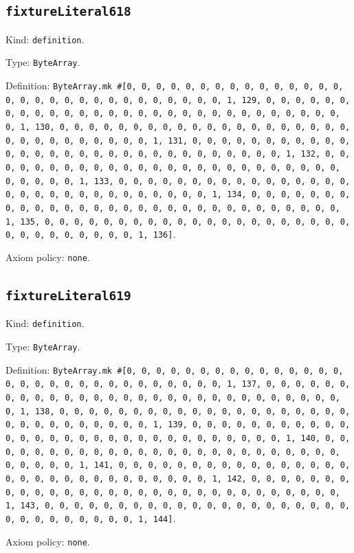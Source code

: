 \documentclass[11pt]{article}
\begin{document}
\subsection*{\texttt{fixtureLiteral618}}
\noindent Kind: \texttt{definition}.\par
\noindent Type: \texttt{ByteArray}.\par
\noindent Definition: \texttt{ByteArray.mk \#[0, 0, 0, 0, 0, 0, 0, 0, 0, 0, 0, 0, 0, 0, 0, 0, 0, 0, 0, 0, 0, 0, 0, 0, 0, 0, 0, 0, 0, 0, 1, 129, 0, 0, 0, 0, 0, 0, 0, 0, 0, 0, 0, 0, 0, 0, 0, 0, 0, 0, 0, 0, 0, 0, 0, 0, 0, 0, 0, 0, 0, 0, 1, 130, 0, 0, 0, 0, 0, 0, 0, 0, 0, 0, 0, 0, 0, 0, 0, 0, 0, 0, 0, 0, 0, 0, 0, 0, 0, 0, 0, 0, 0, 0, 1, 131, 0, 0, 0, 0, 0, 0, 0, 0, 0, 0, 0, 0, 0, 0, 0, 0, 0, 0, 0, 0, 0, 0, 0, 0, 0, 0, 0, 0, 0, 0, 1, 132, 0, 0, 0, 0, 0, 0, 0, 0, 0, 0, 0, 0, 0, 0, 0, 0, 0, 0, 0, 0, 0, 0, 0, 0, 0, 0, 0, 0, 0, 0, 1, 133, 0, 0, 0, 0, 0, 0, 0, 0, 0, 0, 0, 0, 0, 0, 0, 0, 0, 0, 0, 0, 0, 0, 0, 0, 0, 0, 0, 0, 0, 0, 1, 134, 0, 0, 0, 0, 0, 0, 0, 0, 0, 0, 0, 0, 0, 0, 0, 0, 0, 0, 0, 0, 0, 0, 0, 0, 0, 0, 0, 0, 0, 0, 1, 135, 0, 0, 0, 0, 0, 0, 0, 0, 0, 0, 0, 0, 0, 0, 0, 0, 0, 0, 0, 0, 0, 0, 0, 0, 0, 0, 0, 0, 0, 0, 1, 136]}.\par
\noindent Axiom policy: \texttt{none}.\par
\subsection*{\texttt{fixtureLiteral619}}
\noindent Kind: \texttt{definition}.\par
\noindent Type: \texttt{ByteArray}.\par
\noindent Definition: \texttt{ByteArray.mk \#[0, 0, 0, 0, 0, 0, 0, 0, 0, 0, 0, 0, 0, 0, 0, 0, 0, 0, 0, 0, 0, 0, 0, 0, 0, 0, 0, 0, 0, 0, 1, 137, 0, 0, 0, 0, 0, 0, 0, 0, 0, 0, 0, 0, 0, 0, 0, 0, 0, 0, 0, 0, 0, 0, 0, 0, 0, 0, 0, 0, 0, 0, 1, 138, 0, 0, 0, 0, 0, 0, 0, 0, 0, 0, 0, 0, 0, 0, 0, 0, 0, 0, 0, 0, 0, 0, 0, 0, 0, 0, 0, 0, 0, 0, 1, 139, 0, 0, 0, 0, 0, 0, 0, 0, 0, 0, 0, 0, 0, 0, 0, 0, 0, 0, 0, 0, 0, 0, 0, 0, 0, 0, 0, 0, 0, 0, 1, 140, 0, 0, 0, 0, 0, 0, 0, 0, 0, 0, 0, 0, 0, 0, 0, 0, 0, 0, 0, 0, 0, 0, 0, 0, 0, 0, 0, 0, 0, 0, 1, 141, 0, 0, 0, 0, 0, 0, 0, 0, 0, 0, 0, 0, 0, 0, 0, 0, 0, 0, 0, 0, 0, 0, 0, 0, 0, 0, 0, 0, 0, 0, 1, 142, 0, 0, 0, 0, 0, 0, 0, 0, 0, 0, 0, 0, 0, 0, 0, 0, 0, 0, 0, 0, 0, 0, 0, 0, 0, 0, 0, 0, 0, 0, 1, 143, 0, 0, 0, 0, 0, 0, 0, 0, 0, 0, 0, 0, 0, 0, 0, 0, 0, 0, 0, 0, 0, 0, 0, 0, 0, 0, 0, 0, 0, 0, 1, 144]}.\par
\noindent Axiom policy: \texttt{none}.\par
\end{document}
